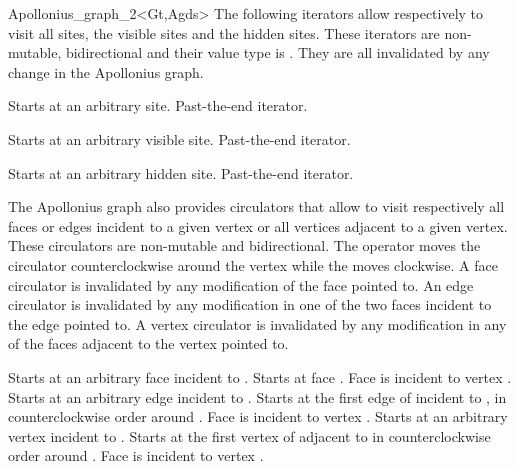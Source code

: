 \begin{ccRefClass}{Apollonius_graph_2<Gt,Agds>}
The following iterators allow respectively to visit 
all sites, the visible sites and the hidden sites.
These iterators are non-mutable, bidirectional and their value type
is . They are all invalidated by any change in the
Apollonius graph.


{Starts at an arbitrary site.}
\ccGlue
{}
{Past-the-end iterator.}

{Starts at an arbitrary visible site.}
\ccGlue
{}
{Past-the-end iterator.}

{Starts at an arbitrary hidden site.}
\ccGlue
{}
{Past-the-end iterator.}


\ccThreeToTwo




The Apollonius graph also provides circulators that allow to visit 
respectively all faces or edges incident to a given vertex
or all vertices adjacent to a given vertex.
These circulators are non-mutable and bidirectional.
 The operator  moves the circulator
counterclockwise around the vertex while
the  moves clockwise.
A face circulator is invalidated by any modification of the face
pointed to.
An edge circulator is invalidated by any modification
in one of the two faces incident to the edge pointed to.
A vertex circulator is invalidated by any modification
in any of the faces adjacent to the vertex pointed to.

{Starts at an arbitrary face incident
to .}
\ccGlue
{}
{Starts at face .
\ccPrecond Face  is incident to vertex .}
\ccGlue
{}
{Starts at an arbitrary edge incident
to .}
\ccGlue
{}
{Starts at the first edge of  incident to 
, in counterclockwise order around .
\ccPrecond Face  is incident to vertex .}
\ccGlue
{}
{Starts at an arbitrary  vertex incident
to .}
\ccGlue
{}
{Starts at the first vertex of  adjacent  to 
in  counterclockwise order around .
\ccPrecond Face  is incident to vertex .}




\end{ccRefClass}
